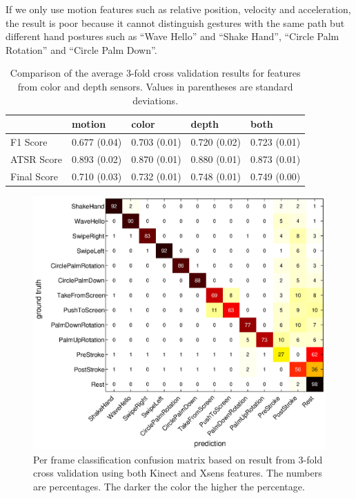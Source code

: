 If we only use motion features such as relative position, velocity and
acceleration, the result is poor because it cannot distinguish gestures with
the same path but different hand postures such as ``Wave Hello'' and ``Shake
Hand'', ``Circle Palm Rotation'' and ``Circle Palm Down''.

\begin{table}[h]
\begin{center}
\begin{tabular}{|l|p{2cm}|p{2cm}|p{1.7cm}|p{1.7cm}|}
\hline
          & motion & color & depth & both \\
\hline
F1 Score & 0.677 (0.04) & 0.703 (0.01) & 0.720 (0.02) & 0.723 (0.01) \\
\hline
ATSR Score & 0.893 (0.02) & 0.870 (0.01) & 0.880 (0.01) & 0.873 (0.01) \\
\hline
Final Score & 0.710 (0.03) & 0.732 (0.01) & 0.748 (0.01) & 0.749 (0.00) \\
\hline
\end{tabular}
\caption{Comparison of the average 3-fold cross validation results for
features from color and depth sensors. Values in parentheses are standard
deviations.}
\label{tab:comp-feature}
\end{center}
\end{table}

\begin{figure}[h]
\centering
\includegraphics[trim={6cm 3.5cm 10cm 1.5cm}, clip,
width=0.5\columnwidth]{figures/confusion-matrix.eps} \caption{Per frame
classification confusion matrix based on result from 3-fold cross validation using both Kinect and Xsens features. The numbers are percentages. The darker the color the higher the percentage.}
\label{fig:confusion}
\end{figure}


